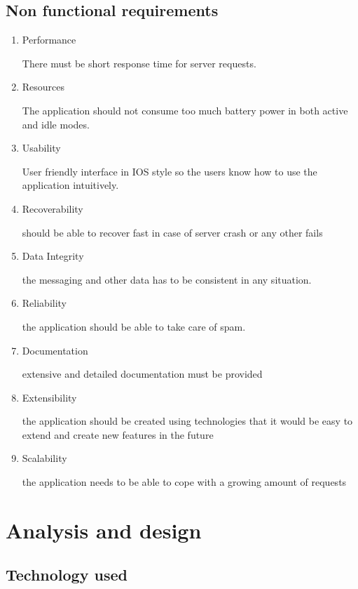 \documentclass[thesis=M,english]{FITthesis}[2012/10/20]
\begin{document}
\section{Non functional requirements}

\begin{enumerate}

\item{Performance} 

There must be short response time for server requests.

\item{Resources} 

The application should not consume too much battery power in both active and idle modes.

\item{Usability}

User friendly interface in IOS style so the users know how to use the application intuitively.

\item{Recoverability}

should be able to recover fast in case of server crash or any other fails

\item{Data Integrity}

the messaging and other data has to be consistent in any situation.

\item{Reliability}

the application should be able to take care of spam.

\item{Documentation}

extensive and detailed documentation must be provided

\item{Extensibility}

the application should be created using technologies that it would be easy to extend and create new features in the future

\item{Scalability}

the application needs to be able to cope with a growing amount of requests 
\end{enumerate}

\chapter{Analysis and design}
\section{Technology used}
\end{document}
